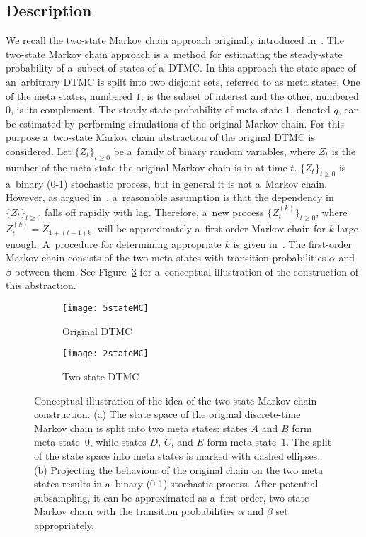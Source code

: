 \documentclass[runningheads,a4paper]{llncs}
\begin{document}
\subsection{Description}
We recall the two-state Markov chain approach originally introduced in~\cite{RL92}. The two-state
Markov chain approach is a~method for estimating the steady-state probability of a~subset of
states of a~DTMC. In this approach the state space of an~arbitrary DTMC is split into two disjoint
sets, referred to as meta states. One of the meta states, numbered $1$, is the subset of interest
and the other, numbered $0$, is its complement. The steady-state probability of meta state $1$,
denoted $q$, can be estimated by performing simulations of the original Markov chain. For this
purpose a~two-state Markov chain abstraction of the original DTMC is considered. Let
$\{Z_t\}_{t\geqslant 0}$ be a~family of binary random variables, where $Z_t$ is the number of the
meta state the original Markov chain is in at time $t$. $\{Z_t\}_{t\geqslant 0}$ is a~binary (0-1)
stochastic process, but in general it is not a~Markov chain. However, as argued in~\cite{RL92},
a~reasonable assumption is that the dependency in $\{Z_t\}_{t\geqslant 0}$ falls off rapidly with
lag. Therefore, a~new process $\{Z_t^{(k)}\}_{t\geqslant 0}$, where $Z_t^{(k)}=Z_{1+(t-1)k}$, will
be approximately a~first-order Markov chain for $k$ large enough. A~procedure for determining
appropriate $k$ is given in~\cite{RL92}. The first-order Markov chain consists of the two meta
states with transition probabilities $\alpha$ and $\beta$ between them. See
Figure~\ref{fig:two-state_MC_approach} for a~conceptual illustration of the construction of this
abstraction.
\begin{figure}[t]
  \centering
  \begin{subfigure}[b]{0.48\textwidth}
    \texttt{[image: 5stateMC]}
    \caption{Original DTMC}
    \label{fig:dtmc}
  \end{subfigure}\quad
  \begin{subfigure}[b]{0.48\textwidth}
    \texttt{[image: 2stateMC]}
    \vspace{5mm}
    \caption{Two-state DTMC }
    \label{fig:two-state_MC}
  \end{subfigure}
  \caption{Conceptual illustration of the idea of the two-state Markov chain construction. (a) The
  state space of the original discrete-time Markov chain is split into two meta states: states
  $A$ and $B$ form meta state~$0$, while states $D$, $C$, and $E$ form meta state~$1$. The split
  of the state space into meta states is marked with dashed ellipses. (b) Projecting the behaviour
  of the original chain on the two meta states results in a~binary (0-1) stochastic process. After
  potential subsampling, it can be approximated as a~first-order, two-state Markov chain with the
  transition probabilities $\alpha$ and $\beta$ set appropriately.}
  \label{fig:two-state_MC_approach}
\end{figure}
\end{document}
